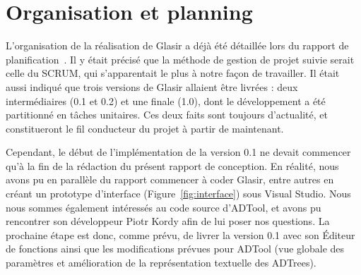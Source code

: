\section{Organisation et planning}
    \label{sec:orga}

    L'organisation de la réalisation de Glasir a déjà été détaillée lors du rapport de planification~\cite{planif}. Il y était précisé que la méthode de gestion de projet suivie serait celle du SCRUM, qui s'apparentait le plus à notre façon de travailler. Il était aussi indiqué que trois versions de Glasir allaient être livrées : deux intermédiaires (0.1 et 0.2) et une finale (1.0), dont le développement a été partitionné en tâches unitaires. Ces deux faits sont toujours d'actualité, et constitueront le fil conducteur du projet à partir de maintenant. 

    Cependant, le début de l'implémentation de la version 0.1 ne devait commencer qu'à la fin de la rédaction du présent rapport de conception. En réalité, nous avons pu en parallèle du rapport commencer à coder Glasir, entre autres en créant un prototype d'interface ({\sc Figure}~\ref{fig:interface}) sous Visual Studio. Nous nous sommes également intéressés au code source d'ADTool, et avons pu rencontrer son développeur Piotr {\sc Kordy} afin de lui poser nos questions. La prochaine étape est donc, comme prévu, de livrer la version 0.1 avec son Éditeur de fonctions ainsi que les modifications prévues pour ADTool (vue globale des paramètres et amélioration de la représentation textuelle des ADTrees).
